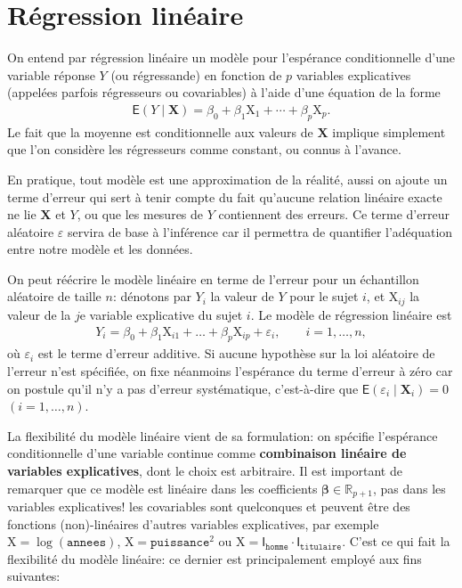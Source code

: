 \documentclass[
  11pt,
  letterpaper,
]{article}
\theoremstyle{definition}
\theoremstyle{definition}
\theoremstyle{definition}
\theoremstyle{definition}
\theoremstyle{remark}
\begin{document}
\hypertarget{regression-lineaire}{%
\section{Régression linéaire}\label{regression-lineaire}}

On entend par régression linéaire un modèle pour l'espérance conditionnelle d'une variable réponse \(Y\) (ou régressande) en fonction de \(p\) variables explicatives (appelées parfois régresseurs ou covariables) à l'aide d'une équation de la forme
\begin{align*}
\mathsf{E}(Y \mid \mathbf{X})=\beta_0 + \beta_1\mathrm{X}_{1} + \cdots + \beta_p \mathrm{X}_{p}.
\end{align*}
Le fait que la moyenne est conditionnelle aux valeurs de \(\mathbf{X}\) implique simplement que l'on considère les régresseurs comme constant, ou connus à l'avance.

En pratique, tout modèle est une approximation de la réalité, aussi on ajoute un terme d'erreur qui sert à tenir compte du fait qu'aucune relation linéaire exacte ne lie \(\mathbf{X}\) et \(Y\), ou que les mesures de \(Y\) contiennent des erreurs. Ce terme d'erreur aléatoire \(\varepsilon\) servira de base à l'inférence car il permettra de quantifier l'adéquation entre notre modèle et les données.

On peut réécrire le modèle linéaire en terme de l'erreur pour un échantillon aléatoire de taille \(n\): dénotons par \(Y_i\) la valeur de \(Y\) pour le sujet \(i\), et \(\mathrm{X}_{ij}\) la valeur de la \(j\)e variable explicative du sujet \(i\). Le modèle de régression linéaire est
\begin{align}
Y_i = \beta_0 + \beta_1 \mathrm{X}_{i1} + \ldots + \beta_p \mathrm{X}_{ip} +\varepsilon_{i}, \qquad i =1, \ldots, n, \label{eq:olsmean}
\end{align}
où \(\varepsilon_i\) est le terme d'erreur additive. Si aucune hypothèse sur la loi aléatoire de l'erreur n'est spécifiée, on fixe néanmoins l'espérance du terme d'erreur à zéro car on postule qu'il n'y a pas d'erreur systématique, c'est-à-dire que \(\mathsf{E}(\varepsilon_i \mid \boldsymbol{X}_i)=0\) \((i=1, \ldots, n)\).

La flexibilité du modèle linéaire vient de sa formulation: on spécifie l'espérance conditionnelle d'une variable continue comme \textbf{combinaison linéaire de variables explicatives}, dont le choix est arbitraire.
Il est important de remarquer que ce modèle est linéaire dans les coefficients \(\boldsymbol{\beta}\in \mathbb{R}_{p+1}\), pas dans les variables explicatives! les covariables sont quelconques et peuvent être des fonctions (non)-linéaires d'autres variables explicatives, par exemple \(\mathrm{X}=\log(\texttt{annees})\), \(\mathrm{X}=\texttt{puissance}^2\) ou \(\mathrm{X}= \mathsf{I}_{\texttt{homme}}\cdot\mathsf{I}_{\texttt{titulaire}}\). C'est ce qui fait la flexibilité du modèle linéaire: ce dernier est principalement employé aux fins suivantes:
\end{document}
